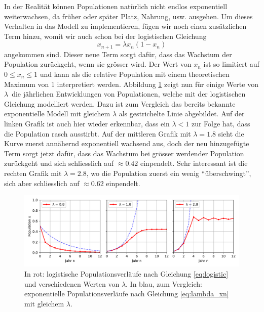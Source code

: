 In der Realität können Populationen natürlich nicht endlos
exponentiell weiterwachsen, 
da früher oder später Platz, Nahrung, usw. ausgehen.
Um dieses Verhalten in das Modell zu implementieren,
fügen wir noch einen zusätzlichen Term hinzu, 
womit wir auch schon bei der logistischen Gleichung 
\begin{equation}
    \label{eq:logistic}
    x_{n+1} = \lambda x_{n} (1 - x_{n})
\end{equation}
angekommen sind.
Dieser neue Term sorgt dafür, 
dass das Wachstum der Population zurückgeht, 
wenn sie grösser wird.
Der Wert von $x_n$ ist so limitiert auf 
$0 \le x_n \le 1$  
und kann als die relative Population mit einem
theoretischen Maximum von 1 interpretiert werden. 
Abbildung \ref{fig:pop_logistic} zeigt nun
für einige Werte von $\lambda$\
die jährlichen Entwicklungen von Populationen,
welche mit der logistischen Gleichung modelliert werden.
Dazu ist zum Vergleich das bereits bekannte exponentielle Modell
mit gleichem $\lambda$ als gestrichelte Linie abgebildet. 
Auf der linken Grafik ist auch hier wieder erkennbar, 
dass ein $\lambda < 1$ zur Folge hat, 
dass die Population rasch ausstirbt. 
Auf der mittleren Grafik mit $\lambda = 1.8$ sieht 
die Kurve zuerst annähernd exponentiell wachsend aus,
doch der neu hinzugefügte Term sorgt jetzt dafür, 
dass das Wachstum bei grösser werdender Population zurückgeht 
und sich schliesslich auf $\approx 0.42$ einpendelt. 
Sehr interessant ist die rechten Grafik mit $\lambda = 2.8$,
wo die Population zuerst ein wenig ``überschwingt'', 
sich aber schliesslich auf $\approx 0.62$ einpendelt.  
\begin{figure}
    \includegraphics[width=\linewidth]{papers/logistic/figures/pop_logistic.pdf}
    \caption{
        In rot:
        logistische Populationsverläufe nach
        Gleichung \eqref{eq:logistic} und
        verschiedenen Werten von $\lambda$.
        In blau, zum Vergleich:
        exponentielle Populationsverläufe nach 
        Gleichung \eqref{eq:lambda_xn} mit gleichem $\lambda$.
    }
    \label{fig:pop_logistic}
\end{figure}
